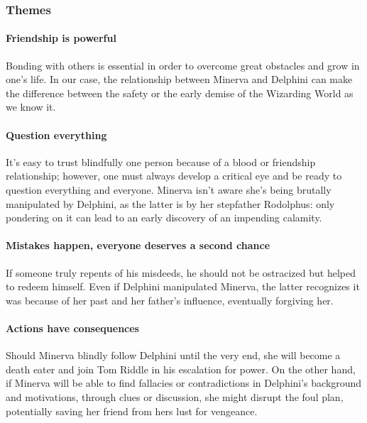 \subsubsection{Themes}

\paragraph{Friendship is powerful}
Bonding with others is essential in order to overcome great obstacles and grow in one's life. In our case, the relationship between Minerva and Delphini can make the difference between the safety or the early demise of the Wizarding World as we know it.

\paragraph{Question everything}
It's easy to trust blindfully one person because of a blood or friendship relationship; however, one must always develop a critical eye and be ready to question everything and everyone. Minerva isn't aware she's being brutally manipulated by Delphini, as the latter is by her stepfather Rodolphus: only pondering on it can lead to an early discovery of an impending calamity.

\paragraph{Mistakes happen, everyone deserves a second chance}
If someone truly repents of his misdeeds, he should not be ostracized but helped to redeem himself. Even if Delphini manipulated Minerva, the latter recognizes it was because of her past and her father's influence, eventually forgiving her.

\paragraph{Actions have consequences}
Should Minerva blindly follow Delphini until the very end, she will become a death eater and join Tom Riddle in his escalation for power. On the other hand, if Minerva will be able to find fallacies or contradictions in Delphini's background and motivations, through clues or discussion, she might disrupt the foul plan, potentially saving her friend from hers lust for vengeance.
\pagebreak